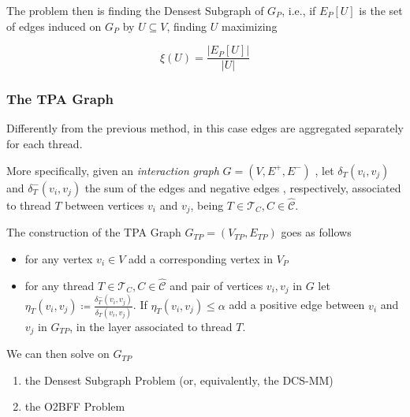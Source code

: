 


The problem then is finding the Densest Subgraph of $G_P$, i.e., if $E_{P} [U]$
is the set of edges induced on $G_P$ by $U \subseteq V$, finding $U$ maximizing

\begin{equation}
	\xi(U) = \frac{|E_{P} [U]|}{|U|}
\end{equation}

\subsubsection{The \acrlong{TPA} Graph}%
\label{ssub:the_tpa_graph}

Differently from the previous method, in this case edges are aggregated
separately for each thread.

\bigskip

More specifically, given an \emph{interaction graph} $G = (V, E^{+}, E^{-})$ ,
let $\delta_{T}(v_{i}, v_{j})$ and
$\delta^{-} _{T}(v_{i}, v_{j})$ the sum of the edges and negative edges , respectively,
associated to thread $T$ between vertices $v_{i} $ and $v_{j} $, being $T \in
	\mathcal{T}_{C}, C \in \mathcal{\hat{C}}$.

The construction of the \acrfull{TPA} Graph $G_{TP} = (V_{TP}, E_{TP})$ goes as follows

\begin{itemize}
	\item for any vertex $v_{i} \in V$ add a corresponding vertex in $V_{P} $
	\item for any thread $T \in
		      \mathcal{T}_{C}, C \in \mathcal{\hat{C}}$ and pair of vertices
	      $v_i, v_j$ in $G$ let $\eta_{T}(v_i,v_j)
		      \coloneqq \frac{\delta^{-} _{T}(v_i,v_j)}{\delta _{T}(v_i,v_j)} $. If
	      $\eta_{T}(v_i,v_j) \leq \alpha $ add a positive edge between $v_{i} $ and
	      $v_{j} $ in $G_{TP} $, in the layer associated to thread $T$.
\end{itemize}

We can then solve on $G_{TP}$

\begin{enumerate}
	\item the Densest Subgraph Problem (or, equivalently, the
	      \acrshort{DCS}-MM)
	\item the \acrshort{O2BFF} Problem
\end{enumerate}

